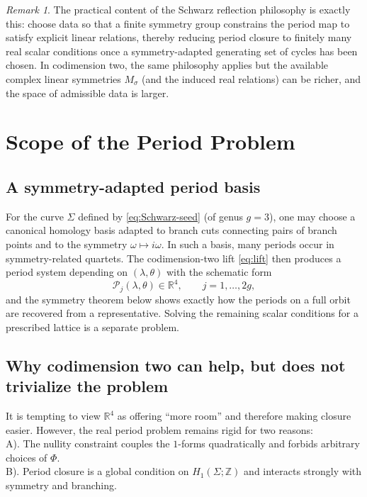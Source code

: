 \documentclass[12pt]{article}
\numberwithin{equation}{section}
\theoremstyle{definition}
\theoremstyle{remark}
\newtheorem{remark}[theorem]{Remark}
\begin{document}
\begin{remark}
The practical content of the Schwarz reflection philosophy is exactly this: choose data so that a finite symmetry group constrains the period map to satisfy explicit linear relations, thereby reducing period closure to finitely many real scalar conditions once a symmetry-adapted generating set of cycles has been chosen.
In codimension two, the same philosophy applies but the available complex linear symmetries $M_\sigma$ (and the induced real relations) can be richer, and the space of admissible data is larger.
\end{remark}

\section{Scope of the Period Problem}\label{sec:strategy}

\subsection{A symmetry-adapted period basis}

For the curve $\Sigma$ defined by \eqref{eq:Schwarz-seed} (of genus $g=3$), one may choose a canonical homology basis adapted to branch cuts connecting pairs of branch points and to the symmetry $\omega\mapsto i\omega$.
In such a basis, many periods occur in symmetry-related quartets.
The codimension-two lift \eqref{eq:lift} then produces a period system depending on $(\lambda,\theta)$ with the schematic form
\[
\mathcal{P}_j(\lambda,\theta)\in\mathbb{R}^4,\qquad j=1,\dots,2g,
\]
and the symmetry theorem below shows exactly how the periods on a full orbit are recovered from a representative.  Solving the remaining scalar conditions for a prescribed lattice is a separate problem.

\subsection{Why codimension two can help, but does not trivialize the problem}

It is tempting to view $\mathbb{R}^4$ as offering ``more room'' and therefore making closure easier.
However, the real period problem remains rigid for two reasons:\\
A). The nullity constraint couples the $1$-forms quadratically and forbids arbitrary choices of $\Phi$.\\
B). Period closure is a global condition on $H_1(\Sigma;\mathbb{Z})$ and interacts strongly with symmetry and branching.\\
\end{document}
